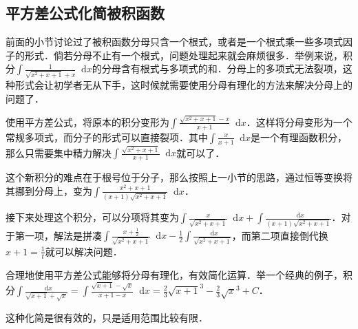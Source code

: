 \documentclass{ctexbook}
\newcommand*{\dif}{\mathop{}\!\mathrm{d}}
\begin{document}
\subsection{平方差公式化简被积函数}
前面的小节讨论过了被积函数分母只含一个根式，或者是一个根式乘一些多项式因子的形式．倘若分母不止有一个根式，问题处理起来就会麻烦很多．举例来说，积分$\int\frac{1}{\sqrt{x^{2}+x+1}+x}\dif{x}$的分母含有根式与多项式的和．分母上的多项式无法裂项，这种形式会让初学者无从下手，这时候就需要使用分母有理化的方法来解决分母上的问题了．\par
使用平方差公式，将原本的积分变形为$\int\frac{\sqrt{x^{2}+x+1}-x}{x+1}\dif{x}$．这样将分母变形为一个常规多项式，而分子的形式可以直接裂项．其中$\int\frac{x}{x+1}\dif{x}$是一个有理函数积分，那么只需要集中精力解决$\int\frac{\sqrt{x^{2}+x+1}}{x+1}\dif{x}$就可以了．\par
这个新积分的难点在于根号位于分子，那么按照上一小节的思路，通过恒等变换将其挪到分母上，变为$\int\frac{x^{2}+x+1}{\left(x+1\right)\sqrt{x^{2}+x+1}}\dif{x}$．\par
接下来处理这个积分，可以分项将其变为$\int\frac{x}{\sqrt{x^{2}+x+1}}\dif{x}+\int\frac{\dif{x}}{\left(x+1\right)\sqrt{x^{2}+x+1}}$．对于第一项，解法是拼凑$\int\frac{x+\frac{1}{2}}{\sqrt{x^{2}+x+1}}\dif{x}-\frac{1}{2}\int\frac{\dif{x}}{\sqrt{x^{2}+x+1}}$，而第二项直接倒代换$x+1=\frac{1}{t}$就可以解决问题．\par
合理地使用平方差公式能够将分母有理化，有效简化运算．举一个经典的例子，积分$\int\frac{\dif{x}}{\sqrt{x+1}+\sqrt{x}}=\int\frac{\sqrt{x+1}-\sqrt{x}}{x+1-x}\dif{x}=\frac{2}{3}\sqrt{x+1}^{3}-\frac{2}{3}\sqrt{x}^{3}+C$．\par
这种化简是很有效的，只是适用范围比较有限．\par
\end{document}
